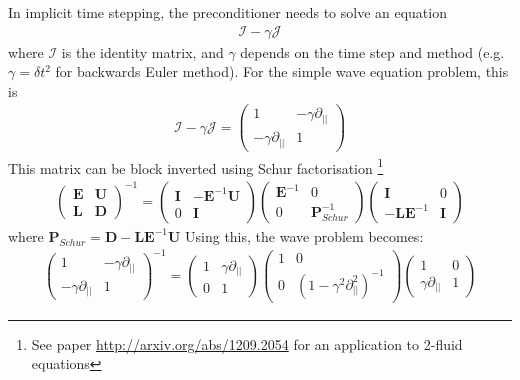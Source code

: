 \documentclass[12pt]{article}
\newcommand{\bb}[1]{\mathbf{#1}}
\def\L{\left}
\def\R{\right}
\begin{document}
In implicit time stepping, the preconditioner needs to solve an equation
%
\begin{align}
\mathcal{I} - \gamma \mathcal{J}
\end{align}
%
where $\mathcal{I}$ is the identity matrix, and $\gamma$ depends on the time
step and method (e.g. $\gamma = \delta t^2$ for backwards Euler method). For
the simple wave equation problem, this is
%
\begin{align}
\mathcal{I} - \gamma \mathcal{J} = \L(%
\begin{array}{cc}
1 & -\gamma\partial_{||} \\
-\gamma\partial_{||} & 1
\end{array}
%
\R)
\end{align}
%
This matrix can be block inverted using Schur factorisation
%
\footnote{See paper \url{http://arxiv.org/abs/1209.2054} for an application to
2-fluid equations}
%
\begin{align}
\L(%
\begin{array}{cc}
  \bb{E} & \bb{U} \\
  \bb{L} & \bb{D}
\end{array}\R)^{-1}
%
 = \L(%
\begin{array}{cc}
  \bb{I} & -\bb{E}^{-1}\bb{U} \\
  0 & \bb{I}
\end{array}
%
\R)\L(%
\begin{array}{cc}
  \bb{E}^{-1} & 0 \\
  0 & \bb{P}_{Schur}^{-1}
\end{array}
%
\R)\L(%
\begin{array}{cc}
  \bb{I} & 0 \\
  -\bb{L}\bb{E}^{-1} & \bb{I}
\end{array}
%
\R)
\end{align}
%
where $\bb{P}_{Schur} = \bb{D} - \bb{L}\bb{E}^{-1}\bb{U}$ Using this, the wave
problem becomes:
%
\begin{align}
\L(%
\begin{array}{cc}
1 & -\gamma\partial_{||} \\
-\gamma\partial_{||} & 1
\end{array}\R)^{-1}
%
 = \L(%
\begin{array}{cc}
1 & \gamma\partial_{||} \\
0 & 1
\end{array}
%
\R)\L(%
\begin{array}{cc}
1 & 0 \\
0 & \L(1 - \gamma^2\partial^2_{||}\R)^{-1}
\end{array}
%
\R)\L(%
\begin{array}{cc}
1 & 0 \\
\gamma\partial_{||} & 1
\end{array}
%
\R)
%
\label{eq:precon}
%
\end{align}
\end{document}
